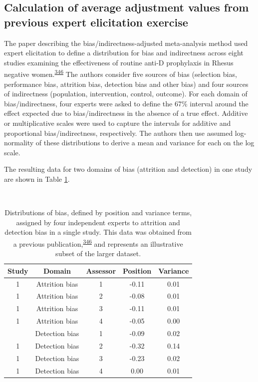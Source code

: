 \documentclass[a4paper, twoside]{templates/ociamthesis}
\begin{document}
\hypertarget{appendix-adjustment-values}{%
\subsection{Calculation of average adjustment values from previous expert elicitation exercise}\label{appendix-adjustment-values}}

The paper describing the bias/indirectness-adjusted meta-analysis method used expert elicitation to define a distribution for bias and indirectness across eight studies examining the effectiveness of routine anti-D prophylaxis in Rhesus negative women.\textsuperscript{\protect\hyperlink{ref-turner2009}{346}} The authors consider five sources of bias (selection bias, performance bias, attrition bias, detection bias and other bias) and four sources of indirectness (population, intervention, control, outcome). For each domain of bias/indirectness, four experts were asked to define the 67\% interval around the effect expected due to bias/indirectness in the absence of a true effect. Additive or multiplicative scales were used to capture the intervals for additive and proportional bias/indirectness, respectively. The authors then use assumed log-normality of these distributions to derive a mean and variance for each on the log scale.

The resulting data for two domains of bias (attrition and detection) in one study are shown in Table \ref{tab:addTable1-table}.

~\\




\begin{table}[H]

\caption[addTable1]{\label{tab:addTable1-table}Distributions of bias, defined by position and variance terms, assigned by four independent experts to attrition and detection bias in a single study. This data was obtained from a previous publication,\textsuperscript{\protect\hyperlink{ref-turner2009}{346}} and represents an illustrative subset of the larger dataset.}
\centering
\begin{tabular}[t]{ccccc}
\toprule
\textbf{Study} & \textbf{Domain} & \textbf{Assessor} & \textbf{Position} & \textbf{Variance}\\
\midrule
1 & Attrition bias & 1 & -0.11 & 0.01\\
1 & Attrition bias & 2 & -0.08 & 0.01\\
1 & Attrition bias & 3 & -0.11 & 0.01\\
1 & Attrition bias & 4 & -0.05 & 0.00\\
\addlinespace
1 & Detection bias & 1 & -0.09 & 0.02\\
1 & Detection bias & 2 & -0.32 & 0.14\\
1 & Detection bias & 3 & -0.23 & 0.02\\
1 & Detection bias & 4 & 0.00 & 0.01\\
\bottomrule
\end{tabular}
\end{table}
\end{document}
